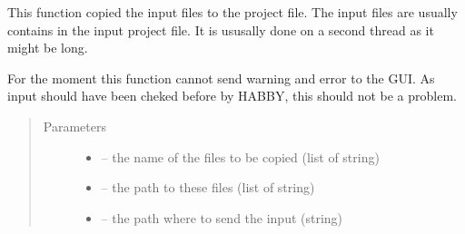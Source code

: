 \documentclass[letterpaper,10pt,english]{sphinxmanual}
\begin{document}

\begin{fulllineitems}
\label{\detokenize{index:src.load_hdf5.copy_files}}
This function copied the input files to the project file. The input files are usually contains in the input
project file. It is ususally done on a second thread as it might be long.

For the moment this function cannot send warning and error to the GUI. As input should have been cheked before
by HABBY, this should not be a problem.
\begin{quote}\begin{description}
\item[{Parameters}] \leavevmode\begin{itemize}
\item {} 
 -- the name of the files to be copied (list of string)

\item {} 
 -- the path to these files (list of string)

\item {} 
 -- the path where to send the input (string)

\end{itemize}

\end{description}\end{quote}

\end{fulllineitems}

\end{document}
